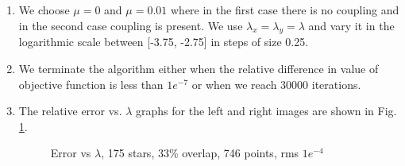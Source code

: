 \begin{enumerate}
\item We choose $\mu = 0$ and $\mu = 0.01$ where in the first case there is no coupling and in the second case coupling is present. We use $\lambda_x = \lambda_y = \lambda$ and vary it in the logarithmic scale between [-3.75, -2.75] in steps of size 0.25. 
\item We terminate the algorithm either when the relative difference in value of objective function is less than $1e^{-7}$ or when we reach 30000 iterations.
\item The relative error vs.  $\lambda$ graphs for the left and right images are shown in Fig. \ref{fig:expt14}.

\vspace{-0.2in}
\begin{figure}[H]

\hspace{-0.1in}
\caption [Error vs $\lambda$, 175 stars, 33\% overlap, 746 points,  rms $1e^{-4}$]{Error vs $\lambda$, 175 stars, 33\% overlap, 746 points, rms $1e^{-4}$}
\label{fig:expt14}
\end{figure}


\end{enumerate}
